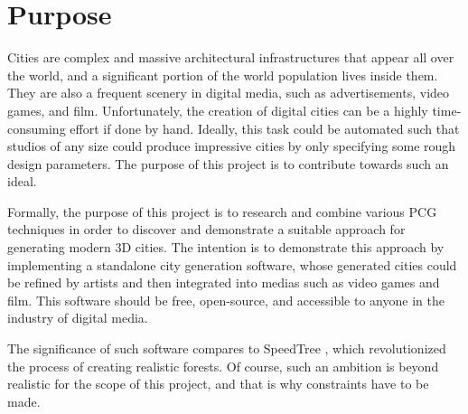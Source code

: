 \section{Purpose}


Cities are complex and massive architectural infrastructures that appear all over the world, and a significant portion of the world population lives inside them.
They are also a frequent scenery in digital media, such as advertisements, video games, and film.
Unfortunately, the creation of digital cities can be a highly time-consuming effort if done by hand.
Ideally, this task could be automated such that studios of any size could produce impressive cities by only specifying some rough design parameters.
The purpose of this project is to contribute towards such an ideal.

Formally, the purpose of this project is to research and combine various PCG techniques in order to discover and demonstrate a suitable approach for generating modern 3D cities. 
The intention is to demonstrate this approach by implementing a standalone city generation software, whose generated cities could be refined by artists and then integrated into medias such as video games and film.
This software should be free, open-source, and accessible to anyone in the industry of digital media.

The significance of such software compares to SpeedTree \cite{speedtree}, which revolutionized the process of creating realistic forests.
Of course, such an ambition is beyond realistic for the scope of this project, and that is why constraints have to be made.